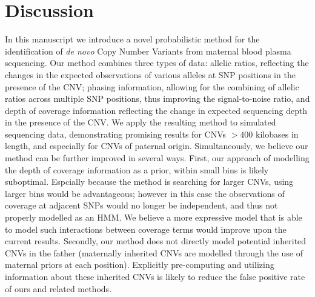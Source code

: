 \section{Discussion}

In this manuscript we introduce a novel probabilistic method for the identification of \textit{de novo} Copy Number Variants from maternal blood plasma sequencing. Our method combines three types of data: allelic ratios, reflecting the changes in the expected observations of various alleles at SNP positions in the presence of the CNV; phasing information, allowing for the combining of allelic ratios across multiple SNP positions, thus improving the signal-to-noise ratio, and depth of coverage information reflecting the change in expected sequencing depth in the presence of the CNV. We apply the resulting method to simulated sequencing data, demonstrating promising results for CNVs $>400$ kilobases in length, and especially for CNVs of paternal origin. 
Simultaneously, we believe our method can be further improved in several ways. First, our approach of modelling the depth of coverage information as a prior, within small bins is likely suboptimal. Espcially because the method is searching for larger CNVs, using larger bins would be advantageous; however in this case the observations of coverage at adjacent SNPs would no longer be independent,  and thus not properly modelled as an HMM. We believe a more expressive model that is able to model such interactions between coverage terms would improve upon the current results. Secondly, our method does not directly model potential inherited CNVs in the father (maternally inherited CNVs are modelled through the use of maternal priors at each position). Explicitly pre-computing and utilizing information about these inherited CNVs is likely to reduce the false positive rate of ours and related methods.

